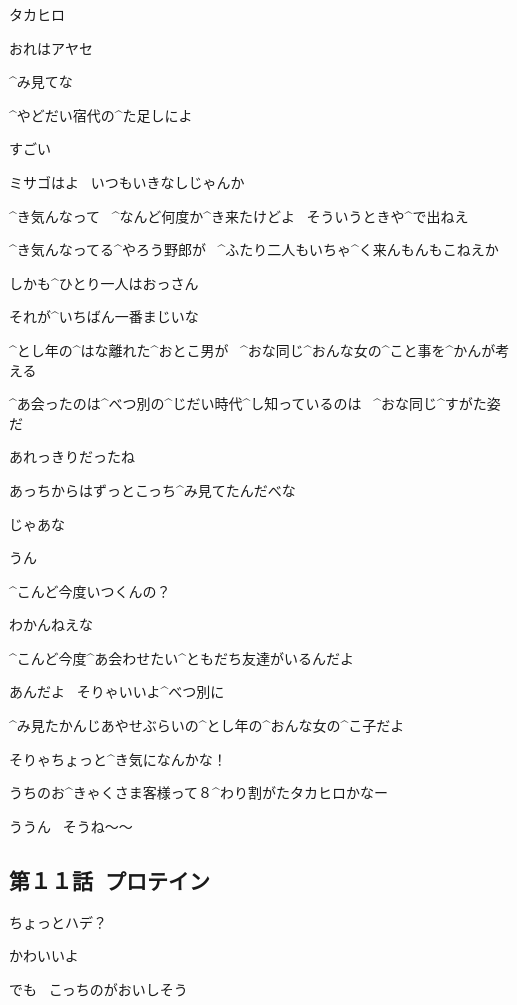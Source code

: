 \Takahiro タカヒロ

\Ayase おれはアヤセ

\Ayase ^{み}{見}てな

\page[44]
\Ayase ^{やどだい}{宿代}の^{た}{足}しによ

\Takahiro すごい

\Ayase ミサゴはよ
\ いつもいきなしじゃんか

\page[45]
\Ayase ^{き}{気}んなって
\ ^{なんど}{何度}か^{き}{来}たけどよ
\ そういうときや^{で}{出}ねえ

\Ayase ^{き}{気}んなってる^{やろう}{野郎}が
\ ^{ふたり}{二人}もいちゃ^{く}{来}んもんもこねえか

\Takahiro しかも^{ひとり}{一人}はおっさん

\Ayase それが^{いちばん}{一番}まじいな

\Narrator ^{とし}{年}の^{はな}{離}れた^{おとこ}{男}が
\ ^{おな}{同}じ^{おんな}{女}の^{こと}{事}を^{かんが}{考}える

\Narrator ^{あ}{会}ったのは^{べつ}{別}の^{じだい}{時代}^{し}{知}っているのは
\ ^{おな}{同}じ^{すがた}{姿}だ

\page[48]
\Ayase あれっきりだったね

\Ayase あっちからはずっとこっち^{み}{見}てたんだべな

\Ayase じゃあな

\Takahiro うん

\Takahiro ^{こんど}{今度}いつくんの？

\Ayase わかんねえな

\page[49]
\Takahiro ^{こんど}{今度}^{あ}{会}わせたい^{ともだち}{友達}がいるんだよ

\Ayase あんだよ
\ そりゃいいよ^{べつ}{別}に

\Takahiro ^{み}{見}たかんじあやせぶらいの^{とし}{年}の^{おんな}{女}の^{こ}{子}だよ

\Ayase そりゃちょっと^{き}{気}になんかな！

\page[50]
\Alpha うちのお^{きゃくさま}{客様}って８^{わり}{割}がたタカヒロかなー

\Alpha ううん
\ そうね〜〜


\subsection{第１１話\ プロテイン}

\page[52]
\Alpha ちょっとハデ？

\Kokone かわいいよ

\page[53]
\Kokone でも
\ こっちのがおいしそう

